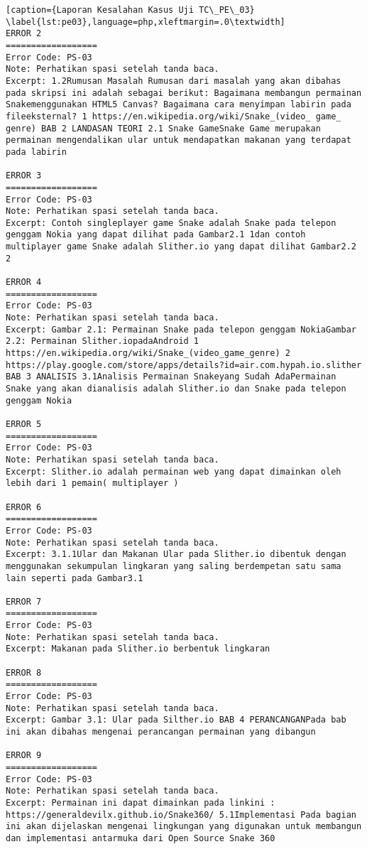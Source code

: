 \begin{enumerate}
\begin{lstlisting}[caption={Laporan Kesalahan Kasus Uji TC\_PE\_03}	\label{lst:pe03},language=php,xleftmargin=.0\textwidth]
ERROR 2
==================
Error Code: PS-03
Note: Perhatikan spasi setelah tanda baca.
Excerpt: 1.2Rumusan Masalah Rumusan dari masalah yang akan dibahas pada skripsi ini adalah sebagai berikut: Bagaimana membangun permainan Snakemenggunakan HTML5 Canvas? Bagaimana cara menyimpan labirin pada fileeksternal? 1 https://en.wikipedia.org/wiki/Snake_(video_ game_ genre) BAB 2 LANDASAN TEORI 2.1 Snake GameSnake Game merupakan permainan mengendalikan ular untuk mendapatkan makanan yang terdapat pada labirin

ERROR 3
==================
Error Code: PS-03
Note: Perhatikan spasi setelah tanda baca.
Excerpt: Contoh singleplayer game Snake adalah Snake pada telepon genggam Nokia yang dapat dilihat pada Gambar2.1 1dan contoh multiplayer game Snake adalah Slither.io yang dapat dilihat Gambar2.2 2 

ERROR 4
==================
Error Code: PS-03
Note: Perhatikan spasi setelah tanda baca.
Excerpt: Gambar 2.1: Permainan Snake pada telepon genggam NokiaGambar 2.2: Permainan Slither.iopadaAndroid 1 https://en.wikipedia.org/wiki/Snake_(video_game_genre) 2 https://play.google.com/store/apps/details?id=air.com.hypah.io.slither BAB 3 ANALISIS 3.1Analisis Permainan Snakeyang Sudah AdaPermainan Snake yang akan dianalisis adalah Slither.io dan Snake pada telepon genggam Nokia 

ERROR 5
==================
Error Code: PS-03
Note: Perhatikan spasi setelah tanda baca.
Excerpt: Slither.io adalah permainan web yang dapat dimainkan oleh lebih dari 1 pemain( multiplayer )

ERROR 6
==================
Error Code: PS-03
Note: Perhatikan spasi setelah tanda baca.
Excerpt: 3.1.1Ular dan Makanan Ular pada Slither.io dibentuk dengan menggunakan sekumpulan lingkaran yang saling berdempetan satu sama lain seperti pada Gambar3.1

ERROR 7
==================
Error Code: PS-03
Note: Perhatikan spasi setelah tanda baca.
Excerpt: Makanan pada Slither.io berbentuk lingkaran

ERROR 8
==================
Error Code: PS-03
Note: Perhatikan spasi setelah tanda baca.
Excerpt: Gambar 3.1: Ular pada Silther.io BAB 4 PERANCANGANPada bab ini akan dibahas mengenai perancangan permainan yang dibangun

ERROR 9
==================
Error Code: PS-03
Note: Perhatikan spasi setelah tanda baca.
Excerpt: Permainan ini dapat dimainkan pada linkini : https://generaldevilx.github.io/Snake360/ 5.1Implementasi Pada bagian ini akan dijelaskan mengenai lingkungan yang digunakan untuk membangun dan implementasi antarmuka dari Open Source Snake 360


\end{lstlisting}
\end{enumerate}
